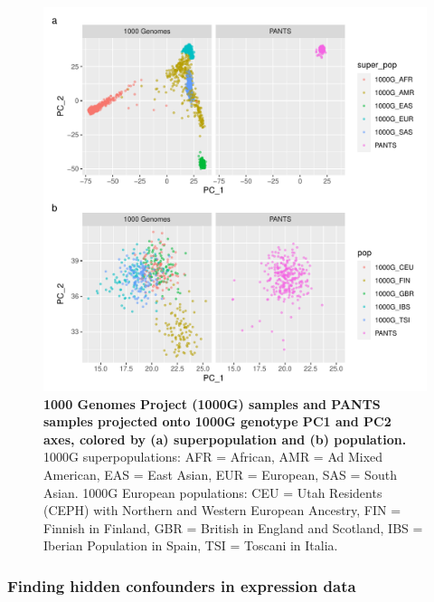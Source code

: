 \begin{figure}
    \centering
    \includegraphics[width=1.0\textwidth,page=1]{mainmatter/figures/chapter_04/pants_samples.sampleids_cleaned_to_lowercase.filtered.GRCh38.sorted.multiPANTS.projection_1000G_pca.pdf}
    \caption{
        \textbf{1000 Genomes Project (1000G) samples and PANTS samples projected onto 1000G genotype PC1 and PC2 axes, colored by (a) superpopulation and (b) population.}
        1000G superpopulations: AFR = African, AMR = Ad Mixed American, EAS = East Asian, EUR = European, SAS = South Asian.
        1000G European populations: CEU = Utah Residents (CEPH) with Northern and Western European Ancestry, FIN = Finnish in Finland, GBR = British in England and Scotland, IBS = Iberian Population in Spain, TSI = Toscani in Italia.
    }
    \label{fig:multipants_genotype_akt_1000g_pca}
\end{figure}

\subsubsection{Finding hidden confounders in expression data}
\label{subsec:multiPANTS_reQTL_PEER}

